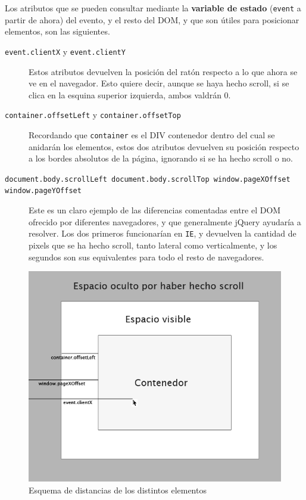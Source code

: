 Los atributos que se pueden consultar mediante la \textbf{variable de estado} (\texttt{event} a partir de ahora) del evento, y el resto del DOM, y que son útiles para posicionar elementos, son las siguientes.

\begin{description}
  \item[\texttt{event.clientX} y \texttt{event.clientY}] Estos atributos devuelven la posición del ratón respecto a lo que ahora se ve en el navegador. Esto quiere decir, aunque se haya hecho scroll, si se clica en la esquina superior izquierda, ambos valdrán 0.
  \item[\texttt{container.offsetLeft} y \texttt{container.offsetTop}] Recordando que \texttt{container} es el DIV contenedor dentro del cual se anidarán los elementos, estos dos atributos devuelven su posición respecto a los bordes absolutos de la página, ignorando si se ha hecho scroll o no.
  \item[\texttt{document.body.scrollLeft document.body.scrollTop window.pageXOffset window.pageYOffset}] Este es un claro ejemplo de las diferencias comentadas entre el DOM ofrecido por diferentes navegadores, y que generalmente jQuery ayudaría a resolver. Los dos primeros funcionarían en \texttt{IE}, y devuelven la cantidad de pixels que se ha hecho scroll, tanto lateral como verticalmente, y los segundos son sus equivalentes para todo el resto de navegadores.
\end{description}


\begin{figure}[h!]
\centering
\includegraphics[width=\textwidth]{mouse_pointer.png}
\caption{Esquema de distancias de los distintos elementos}\label{fig:mouse_pointer}
\end{figure}

